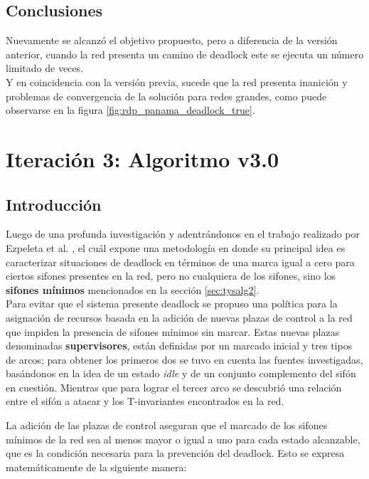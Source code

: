 \subsection{Conclusiones}
Nuevamente se alcanzó el objetivo propuesto, pero a diferencia de la versión anterior, cuando la red presenta un camino de deadlock este se ejecuta un número limitado de veces. \\ 
Y en coincidencia con la versión previa, sucede que la red presenta inanición y problemas de convergencia de la solución para redes grandes, como puede observarse en la figura \ref{fig:rdp_panama_deadlock_true}. \\
\section{Iteración 3: Algoritmo v3.0}
\subsection{Introducción}

Luego de una profunda investigación y adentrándonos en el trabajo realizado por Ezpeleta et al. \cite{paperezpeleta}, el cuál expone una metodología en donde su principal idea es caracterizar situaciones de deadlock en términos de una marca igual a cero para ciertos sifones presentes en la red, pero no cualquiera de los sifones, sino los \textbf{sifones mínimos} mencionados en la sección \ref{sec:tysalg2}.\\
Para evitar que el sistema presente deadlock se propuso una política para la asignación de recursos basada en la adición de nuevas plazas de control a la red que impiden la presencia de sifones mínimos sin marcar. Estas nuevas plazas denominadas \textbf{supervisores}, están definidas por un marcado inicial y tres tipos de arcos; para obtener los primeros dos se tuvo en cuenta las fuentes investigadas, basándonos en la idea de un estado \textit{idle} y de un conjunto complemento del sifón en cuestión. Mientras que para lograr el tercer arco se descubrió una relación entre el sifón a atacar y los T-invariantes encontrados en la red. \\
\par
La adición de las plazas de control aseguran que el marcado de los sifones mínimos de la red sea al menos mayor o igual a uno para cada estado alcanzable, que es la condición necesaria para la prevención del deadlock. 
Esto se expresa matemáticamente de la siguiente manera:

